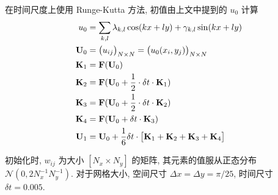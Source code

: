 在时间尺度上使用 Runge-Kutta 方法, 初值由上文中提到的 $u_0$ 计算
\[ \begin{aligned}
u_0 &= \sum_{k, l} \lambda_{k, l}\cos(kx+ly) + \gamma_{k, l}\sin(kx+ly) \\
{\mathbf U}_0 &= \bigl(u_{ij}\bigr)_{N \times N}
    = \bigl(u_0(x_i, y_j)\bigr)_{N \times N} \\
{\mathbf K}_1 &= {\mathbf F}({\mathbf U}_0) \\
{\mathbf K}_2 &= {\mathbf F}({\mathbf U}_0 + \frac{1}{2} \cdot\delta t \cdot {\mathbf K}_1) \\
{\mathbf K}_3 &= {\mathbf F}({\mathbf U}_0 + \frac{1}{2} \cdot\delta t \cdot {\mathbf K}_2) \\
{\mathbf K}_4 &= {\mathbf F}({\mathbf U}_0 + \delta t \cdot {\mathbf K}_3) \\
{\mathbf U}_1 &= {\mathbf U}_0 + \frac{1}{6}\delta t \cdot \bigl[
    {\mathbf K}_1 + {\mathbf K}_2 + {\mathbf K}_3 + {\mathbf K}_4 \bigr] \\
\end{aligned} \]

初始化时, $w_{ij}$ 为大小 $[N_x \times N_y]$ 的矩阵, 其元素的值服从正态分布
$\mathcal N(0, 2N_x^{-1}N_y^{-1})$. 对于网格大小, 空间尺寸
$\Delta x = \Delta y = \pi/25$, 时间尺寸 $\delta t = 0.005$.
\endinput
